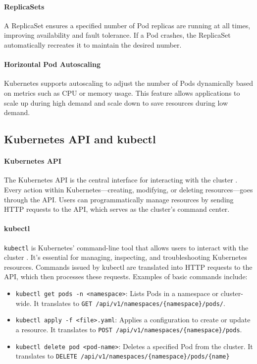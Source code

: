 \documentclass[main.tex]{subfiles}
\begin{document}
\paragraph{ReplicaSets}
A ReplicaSet ensures a specified number of Pod replicas are running at all times, improving availability and fault tolerance. If a Pod crashes, the ReplicaSet automatically recreates it to maintain the desired number.

\paragraph{Horizontal Pod Autoscaling}
Kubernetes supports autoscaling to adjust the number of Pods dynamically based on metrics such as CPU or memory usage. This feature allows applications to scale up during high demand and scale down to save resources during low demand.


\subsection{Kubernetes API and kubectl}
\paragraph{Kubernetes API}
The Kubernetes API is the central interface for interacting with the cluster \cite{kubernetes-api}. Every action within Kubernetes—creating, modifying, or deleting resources—goes through the API. Users can programmatically manage resources by sending HTTP requests to the API, which serves as the cluster’s command center.

\paragraph{kubectl}
\texttt{kubectl} is Kubernetes' command-line tool that allows users to interact with the cluster \cite{kubernetes-kubectl}. It’s essential for managing, inspecting, and troubleshooting Kubernetes resources. Commands issued by kubectl are translated into HTTP requests to the API, which then processes these requests.
Examples of basic commands include:
\begin{itemize}
    \item \texttt{kubectl get pods -n <namespace>}: Lists Pods in a namespace or cluster-wide. It translates to  \texttt{GET /api/v1/namespaces/\{namespace\}/pods/}. 
    \item \texttt{kubectl apply -f <file>.yaml}: Applies a configuration to create or update a resource. It translates to \texttt{POST /api/v1/namespaces/\{namespace\}/pods}.
    \item \texttt{kubectl delete pod <pod-name>}: Deletes a specified Pod from the cluster. It translates to \texttt{DELETE /api/v1/namespaces/\{namespace\}/pods/\{name\}}
\end{itemize}
\end{document}
